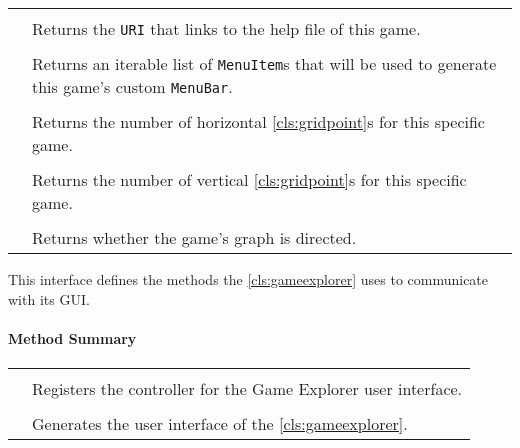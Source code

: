 \begin{longtable}{Lp{10cm}}
	 \\
	& Returns the \texttt{URI} that links to the help file of this game. \\
	 \\
	& Returns an iterable list of \texttt{MenuItem}s that will be used to generate this game's custom \texttt{MenuBar}. \\
	 \\
	& Returns the number of horizontal \ref{cls:gridpoint}s for this specific game. \\
	 \\
	& Returns the number of vertical \ref{cls:gridpoint}s for this specific game. \\
	 \\
	& Returns whether the game's graph is directed. \\
	\hline
\end{longtable}

\pagebreak

This interface defines the methods the \ref{cls:gameexplorer} uses to communicate with its \gls{GUI}. \\

\centerdash

\paragraph*{Method Summary}
\paragraph*{}
\begin{longtable}{Lp{10cm}}
	\startmethodtable
	 \\
	& Registers the controller for the Game Explorer user interface. \\
	 \\
	& Generates the user interface of the \ref{cls:gameexplorer}. \\
	\hline
\end{longtable}

